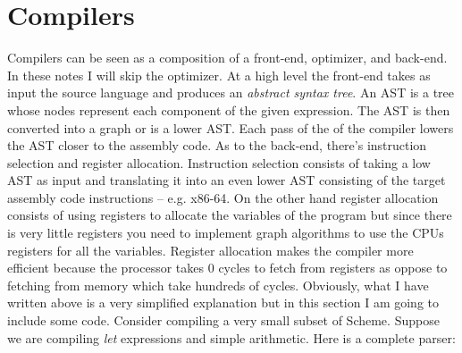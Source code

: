 \documentclass{amsbook}
\begin{document}
\chapter{Compilers}

Compilers can be seen as a composition of a front-end, optimizer, and back-end. In these notes I will skip the optimizer. At a high level the front-end takes as input the source language and produces an \textit{abstract syntax tree}. An AST is a tree whose nodes represent each component of the given expression. The AST is then converted into a graph or is a lower AST. Each pass of the of the compiler lowers the AST closer to the assembly code. As to the back-end, there's instruction selection and register allocation. Instruction selection consists of taking a low AST as input and translating it into an even lower AST consisting of the target assembly code instructions -- e.g. x86-64. On the other hand register allocation consists of using registers to allocate the variables of the program but since there is very little registers you need to implement graph algorithms to use the CPUs registers for all the variables. Register allocation makes the compiler more efficient because the processor takes 0 cycles to fetch from registers as oppose to fetching from memory which take hundreds of cycles. Obviously, what I have written above is a very simplified explanation but in this section I am going to include some code. Consider compiling a very small subset of Scheme. Suppose we are compiling \textit{let} expressions and simple arithmetic. Here is a complete parser:
\end{document}
